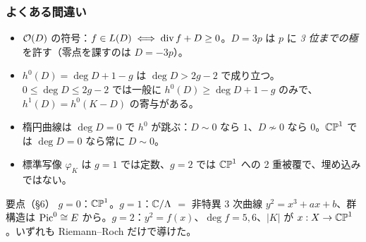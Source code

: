 \subsubsection*{よくある間違い}
\begin{itemize}
\item $\mathcal O(D)$ の符号：$f\in L(D)\iff\operatorname{div} f+D\ge0$。$D=3p$ は $p$ に \emph{3 位までの極} を許す（零点を課すのは $D=-3p$）。
\item $h^0(D)=\deg D+1-g$ は $\deg D>2g-2$ で成り立つ。$0\le\deg D\le2g-2$ では一般に $h^0(D)\ge\deg D+1-g$ のみで、$h^1(D)=h^0(K-D)$ の寄与がある。
\item 楕円曲線は $\deg D=0$ で $h^0$ が跳ぶ：$D\sim0$ なら $1$、$D\not\sim0$ なら $0$。$\mathbb{CP}^1$ では $\deg D=0$ なら常に $D\sim0$。
\item 標準写像 $\varphi_K$ は $g=1$ では定数、$g=2$ では $\mathbb{CP}^1$ への 2 重被覆で、埋め込みではない。
\end{itemize}

\begin{keybox}{要点（§6）}
$g=0$：$\mathbb{CP}^1$。$g=1$：$\mathbb C/\Lambda$ $=$ 非特異 3 次曲線 $y^2=x^3+ax+b$、群構造は $\mathrm{Pic}^0\cong E$ から。$g=2$：$y^2=f(x)$、$\deg f=5,6$、$|K|$ が $x:X\to\mathbb{CP}^1$。いずれも Riemann--Roch だけで導けた。
\end{keybox}

